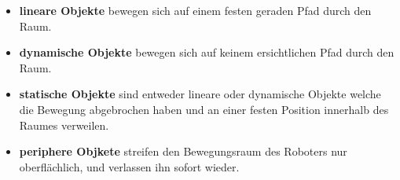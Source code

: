 \begin{itemize}
\item \textbf{lineare Objekte} bewegen sich auf einem festen geraden Pfad durch den Raum.
\item \textbf{dynamische Objekte} bewegen sich auf keinem ersichtlichen Pfad durch den Raum.
\item \textbf{statische Objekte} sind entweder lineare oder dynamische Objekte welche die Bewegung abgebrochen haben und an einer festen Position innerhalb des Raumes verweilen.
\item \textbf{periphere Objkete} streifen den Bewegungsraum des Roboters nur oberflächlich, und verlassen ihn sofort wieder.
\end{itemize}


